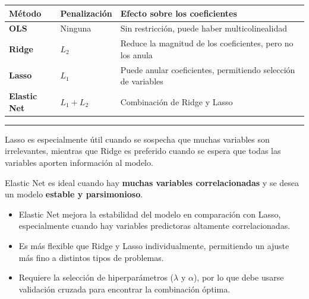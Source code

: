\documentclass[
  letterpaper,
  DIV=11,
  numbers=noendperiod]{scrreprt}
\begin{document}
\begin{longtable}[]{@{}
  >{\raggedright\arraybackslash}p{}
  >{\raggedright\arraybackslash}p{}
  >{\raggedright\arraybackslash}p{}@{}}
\toprule\noalign{}
\begin{minipage}[b]{\linewidth}\raggedright
Método
\end{minipage} & \begin{minipage}[b]{\linewidth}\raggedright
Penalización
\end{minipage} & \begin{minipage}[b]{\linewidth}\raggedright
Efecto sobre los coeficientes
\end{minipage} \\
\midrule\noalign{}
\endhead
\bottomrule\noalign{}
\endlastfoot
\textbf{OLS} & Ninguna & Sin restricción, puede haber
multicolinealidad \\
\textbf{Ridge} & \(L_2\) & Reduce la magnitud de los coeficientes, pero
no los anula \\
\textbf{Lasso} & \(L_1\) & Puede anular coeficientes, permitiendo
selección de variables \\
\textbf{Elastic Net} & \(L_1 + L_2\) & Combinación de Ridge y Lasso \\
\end{longtable}

\begin{center}\rule{0.5\linewidth}{0.5pt}\end{center}

Lasso es especialmente útil cuando se sospecha que muchas variables son
irrelevantes, mientras que Ridge es preferido cuando se espera que todas
las variables aporten información al modelo.

Elastic Net es ideal cuando hay \textbf{muchas variables
correlacionadas} y se desea un modelo \textbf{estable y parsimonioso}.

\begin{itemize}
\item
  Elastic Net mejora la estabilidad del modelo en comparación con Lasso,
  especialmente cuando hay variables predictoras altamente
  correlacionadas.
\item
  Es más flexible que Ridge y Lasso individualmente, permitiendo un
  ajuste más fino a distintos tipos de problemas.
\item
  Requiere la selección de hiperparámetros (\(\lambda\) y \(\alpha\)),
  por lo que debe usarse validación cruzada para encontrar la
  combinación óptima.
\end{itemize}
\end{document}
